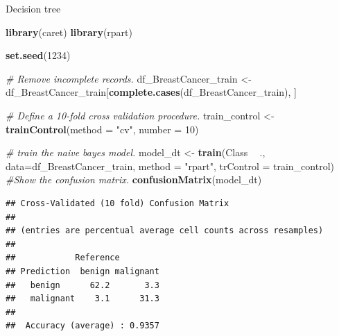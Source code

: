 \documentclass[12pt,ignorenonframetext,]{beamer}
\newenvironment{Shaded}{\begin{snugshade}}{\end{snugshade}}
\newcommand{\CommentTok}[1]{\textcolor[rgb]{0.56,0.35,0.01}{\textit{#1}}}
\newcommand{\DataTypeTok}[1]{\textcolor[rgb]{0.13,0.29,0.53}{#1}}
\newcommand{\DecValTok}[1]{\textcolor[rgb]{0.00,0.00,0.81}{#1}}
\newcommand{\KeywordTok}[1]{\textcolor[rgb]{0.13,0.29,0.53}{\textbf{#1}}}
\newcommand{\NormalTok}[1]{#1}
\newcommand{\OperatorTok}[1]{\textcolor[rgb]{0.81,0.36,0.00}{\textbf{#1}}}
\newcommand{\StringTok}[1]{\textcolor[rgb]{0.31,0.60,0.02}{#1}}
\begin{document}
\begin{frame}[fragile]{Decision tree}
\protect\hypertarget{decision-tree}{}

\tiny

\begin{Shaded}
\begin{Highlighting}[]
\KeywordTok{library}\NormalTok{(caret)}
\KeywordTok{library}\NormalTok{(rpart)}

\KeywordTok{set.seed}\NormalTok{(}\DecValTok{1234}\NormalTok{)}

\CommentTok{# Remove incomplete records.}
\NormalTok{df_BreastCancer_train <-}\StringTok{ }\NormalTok{df_BreastCancer_train[}\KeywordTok{complete.cases}\NormalTok{(df_BreastCancer_train), ]}

\CommentTok{# Define a 10-fold cross validation procedure.}
\NormalTok{train_control <-}\StringTok{ }\KeywordTok{trainControl}\NormalTok{(}\DataTypeTok{method =} \StringTok{"cv"}\NormalTok{, }\DataTypeTok{number =} \DecValTok{10}\NormalTok{)}

\CommentTok{# train the naive bayes model.}
\NormalTok{model_dt <-}\StringTok{ }\KeywordTok{train}\NormalTok{(Class }\OperatorTok{~}\StringTok{ }\NormalTok{., }\DataTypeTok{data=}\NormalTok{df_BreastCancer_train, }\DataTypeTok{method =} \StringTok{"rpart"}\NormalTok{, }\DataTypeTok{trControl =}\NormalTok{ train_control)}
\CommentTok{#Show the confusion matrix.}
\KeywordTok{confusionMatrix}\NormalTok{(model_dt)}
\end{Highlighting}
\end{Shaded}

\begin{verbatim}
## Cross-Validated (10 fold) Confusion Matrix 
## 
## (entries are percentual average cell counts across resamples)
##  
##            Reference
## Prediction  benign malignant
##   benign      62.2       3.3
##   malignant    3.1      31.3
##                             
##  Accuracy (average) : 0.9357
\end{verbatim}

\normalsize

\end{frame}
\end{document}
